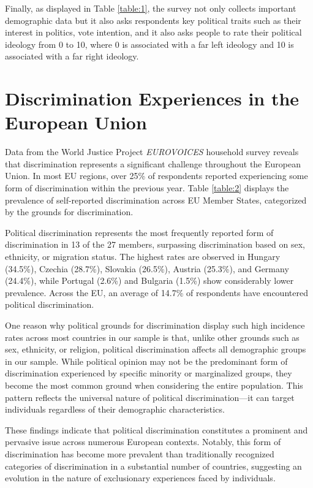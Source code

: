 \documentclass{article}
\begin{document}
Finally, as displayed in Table \ref{table:1}, the survey not only collects important demographic data but it also asks respondents key political traits such as their interest in politics, vote intention, and it also asks people to rate their political ideology from 0 to 10, where 0 is associated with a far left ideology and 10 is associated with a far right ideology.

\section{Discrimination Experiences in the European Union}

Data from the World Justice Project \emph{EUROVOICES} household survey reveals that discrimination represents a significant challenge throughout the European Union. In most EU regions, over 25\% of respondents reported experiencing some form of discrimination within the previous year. Table \ref{table:2} displays the prevalence of self-reported discrimination across EU Member States, categorized by the grounds for discrimination.

Political discrimination represents the most frequently reported form of discrimination in 13 of the 27 members, surpassing discrimination based on sex, ethnicity, or migration status. The highest rates are observed in Hungary (34.5\%), Czechia (28.7\%), Slovakia (26.5\%), Austria (25.3\%), and Germany (24.4\%), while Portugal (2.6\%) and Bulgaria (1.5\%) show considerably lower prevalence. Across the EU, an average of 14.7\% of respondents have encountered political discrimination.

One reason why political grounds for discrimination display such high incidence rates across most countries in our sample is that, unlike other grounds such as sex, ethnicity, or religion, political discrimination affects all demographic groups in our sample. While political opinion may not be the predominant form of discrimination experienced by specific minority or marginalized groups, they become the most common ground when considering the entire population. This pattern reflects the universal nature of political discrimination—it can target individuals regardless of their demographic characteristics.

These findings indicate that political discrimination constitutes a prominent and pervasive issue across numerous European contexts. Notably, this form of discrimination has become more prevalent than traditionally recognized categories of discrimination in a substantial number of countries, suggesting an evolution in the nature of exclusionary experiences faced by individuals.
\end{document}
